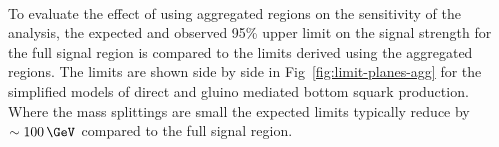 \begin{figure}[!tbhp]
\begin{center}
     \\
  \end{center}
\end{figure}

To evaluate the effect of using aggregated regions on the sensitivity of the \alphat analysis, 
the expected and observed 95\% upper limit on the signal strength for the full signal region 
is compared to the limits derived using the aggregated regions. The limits are shown side by side
in Fig~\ref{fig:limit-planes-agg} for the simplified models of direct and 
gluino mediated bottom squark production. Where the mass
splittings are small the expected limits typically reduce by $\sim100\,\GeV$ 
compared to the full signal region.

